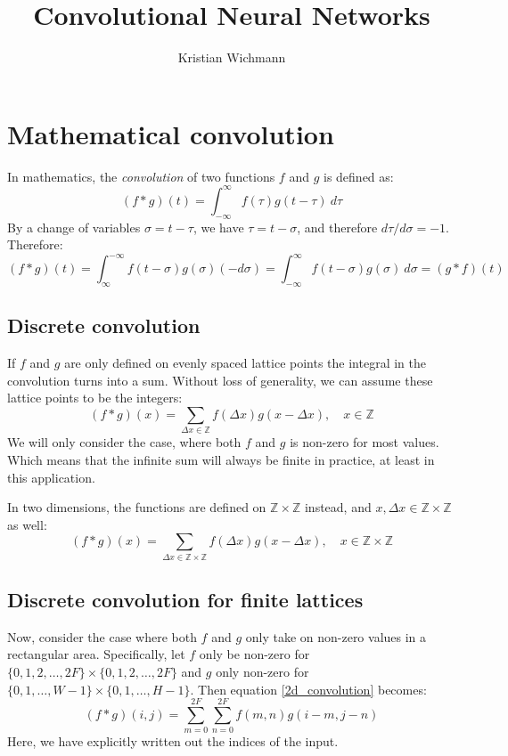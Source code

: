 \documentclass[12pt, a4paper]{article}
\title{Convolutional Neural Networks}
\author{Kristian Wichmann}
\numberwithin{equation}{section}
\begin{document}
\maketitle

\section{Mathematical convolution}
In mathematics, the \textit{convolution} of two functions $f$ and $g$ is defined as:
\begin{equation}
(f*g)(t)=\int_{-\infty}^\infty f(\tau)g(t-\tau)\ d\tau
\end{equation}
By a change of variables $\sigma=t-\tau$, we have $\tau=t-\sigma$, and therefore $d\tau/d\sigma=-1$. Therefore:
\begin{equation}
(f*g)(t)=\int_\infty^{-\infty}f(t-\sigma)g(\sigma)(-d\sigma)=\int_{-\infty}^\infty f(t-\sigma)g(\sigma)\ d\sigma=(g*f)(t)
\end{equation}

\subsection{Discrete convolution}
If $f$ and $g$ are only defined on evenly spaced lattice points the integral in the convolution turns into a sum. Without loss of generality, we can assume these lattice points to be the integers:
\begin{equation}
(f*g)(x)=\sum_{\Delta x\in\mathbb{Z}}f(\Delta x)g(x-\Delta x),\quad x\in\mathbb{Z}
\end{equation}
We will only consider the case, where both $f$ and $g$ is non-zero for most values. Which means that the infinite sum will always be finite in practice, at least in this application.

In two dimensions, the functions are defined on $\mathbb{Z}\times\mathbb{Z}$ instead, and $x,\Delta x\in\mathbb{Z}\times\mathbb{Z}$ as well:
\begin{equation}
(f*g)(x)=\sum_{\Delta x\in\mathbb{Z}\times\mathbb{Z}}f(\Delta x)g(x-\Delta x),\quad x\in\mathbb{Z}\times\mathbb{Z}
\label{2d_convolution}
\end{equation}

\subsection{Discrete convolution for finite lattices}
Now, consider the case where both $f$ and $g$ only take on non-zero values in a rectangular area. Specifically, let $f$ only be non-zero for $\{0,1,2,\ldots,2F\}\times\{0,1,2,\ldots,2F\}$ and $g$ only non-zero for $\{0,1,\ldots,W-1\}\times\{0,1,\ldots,H-1\}$. Then equation \ref{2d_convolution} becomes:
\begin{equation}
(f*g)(i,j)=\sum_{m=0}^{2F}\sum_{n=0}^{2F}f(m,n)g(i-m,j-n)
\label{finite_2d_convolution}
\end{equation}
Here, we have explicitly written out the indices of the input.
\end{document}
